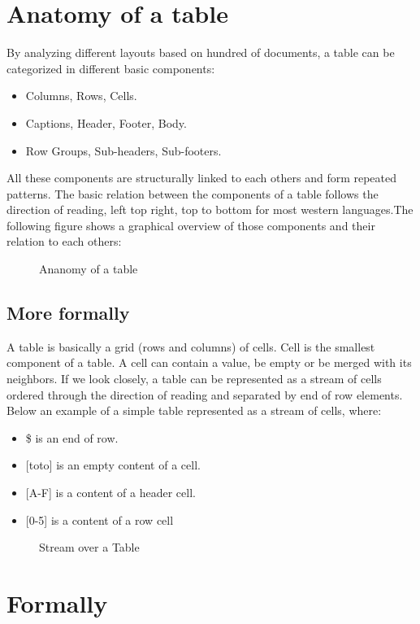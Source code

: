 \documentclass{article}
\begin{document}
\section{Anatomy of a table}
By analyzing different layouts based on hundred of documents, a table can be categorized in different basic components:
\begin{itemize}
    \item Columns, Rows, Cells.
    \item Captions, Header, Footer, Body.
    \item Row Groups, Sub-headers, Sub-footers.
\end{itemize}
All these components are structurally linked to each others and form repeated patterns. The basic relation between the
components of a table follows the direction of reading, left top right, top to bottom for most western languages.The
following figure shows a graphical overview of those components and their relation to each others:
\begin{figure}[H]
\caption{Ananomy of a table}

\end{figure}

\subsection{More formally}
A table is basically a grid (rows and columns) of cells. Cell is the smallest component of a table. A cell can contain a
value, be empty or be merged with its neighbors. If we look closely, a table can be represented as a stream of cells
ordered through the direction of reading and separated by end of row elements. Below an example of a simple table
represented as a stream of cells, where:
\begin{itemize}
    \item{\$} is an end of row.
    \item{[toto]} is an empty content of a cell.
    \item{[A-F]} is a content of a header cell.
    \item{[0-5]} is a content of a row cell
\end{itemize}
\begin{figure}[H]
\caption{Stream over a Table}

\end{figure}

\section{Formally}
\end{document}
